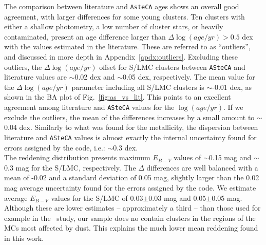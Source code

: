 \documentclass{aa}
\begin{document}
The comparison between literature and \texttt{AsteCA} ages shows an overall good
agreement, with larger differences for some young clusters. Ten clusters with
either a shallow photometry, a low number of cluster stars, or heavily
contaminated, present an age difference larger than $\Delta \log(age/yr){>}0.5$
dex with the values estimated in the literature.
These are referred to as ``outliers'', and discussed in more depth in
Appendix~\ref{apdx:outliers}.
%
%
Excluding these outliers, the $\Delta \log(age/yr)$ offset for S/LMC clusters
between \texttt{ASteCA} and literature values are $\sim$0.02 dex and $\sim$0.05
dex, respectively.
The mean value for the $\Delta \log(age/yr)$ parameter including all S/LMC
clusters is $\sim$-0.01 dex, as shown in the BA plot of
Fig.~\ref{fig:as_vs_lit}. This points to an excellent agreement among
literature and \texttt{ASteCA} values for the $\log(age/yr)$.
If we exclude the outliers, the mean of the differences increases by a small
amount to $\sim$0.04 dex.
Similarly to what was found for the metallicity, the dispersion between
literature and \texttt{ASteCA} values is almost exactly the internal uncertainty
found for errors assigned by the code, i.e.: $\sim$0.3 dex.\\

The reddening distribution presents maximum $E_{B-V}$ values of $\sim$0.15
mag and $\sim$0.3 mag for the S/LMC, respectively.
The $\Delta$ differences are well balanced with a mean of -0.02 and a
standard deviation of 0.05 mag, slightly larger than the 0.02 mag average
uncertainty found for the errors assigned by the code. We estimate average
$E_{B-V}$ values for the S/LMC of 0.03$\pm$0.03 mag and 0.05$\pm$0.05 mag.
Although these are lower estimates -- approximately a third -- than those used
for example in the~\cite{Hunter_2003} study, our sample does no contain clusters
in the regions of the MCs most affected by dust. This explains the much lower
mean reddening found in this work.\\
\end{document}
